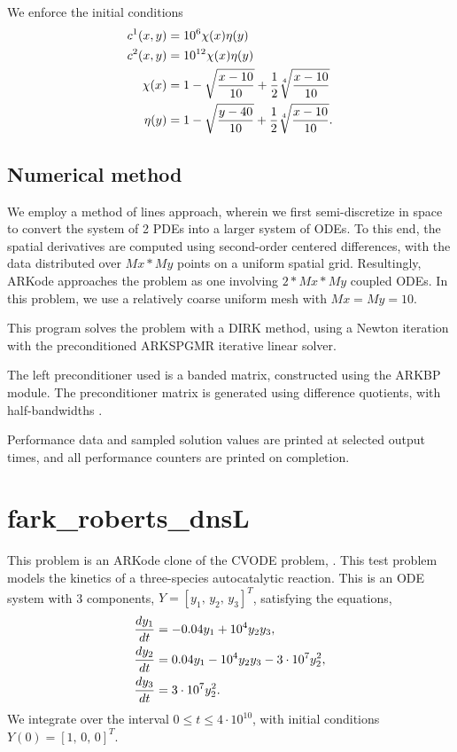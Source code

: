 \documentclass[letterpaper,10pt,english]{sphinxmanual}
\begin{document}
We enforce the initial conditions
\begin{gather}
\begin{split}c^1(x,y) &=  10^6 \chi(x)\eta(y) \\
c^2(x,y) &=  10^{12} \chi(x)\eta(y) \\
\chi(x) &= 1 - \sqrt{\frac{x - 10}{10}} + \frac12 \sqrt[4]{\frac{x - 10}{10}} \\
\eta(y) &= 1 - \sqrt{\frac{y - 40}{10}} + \frac12 \sqrt[4]{\frac{x - 10}{10}}.\end{split}\notag
\end{gather}

\subsection{Numerical method}
\label{f77_serial:numerical-method}
We employ a method of lines approach, wherein we first
semi-discretize in space to convert the system of 2 PDEs into a larger
system of ODEs.  To this end, the spatial derivatives are computed
using second-order centered differences, with the data distributed
over $Mx*My$ points on a uniform spatial grid.  Resultingly, ARKode
approaches the problem as one involving $2*Mx*My$ coupled ODEs.
In this problem, we use a relatively coarse uniform mesh with
$Mx=My=10$.

This program solves the problem with a DIRK method, using a Newton
iteration with the preconditioned ARKSPGMR iterative linear solver.

The left preconditioner used is a banded matrix, constructed using
the ARKBP module.  The preconditioner matrix is generated using
difference quotients, with half-bandwidths .

Performance data and sampled solution values are printed at
selected output times, and all performance counters are printed
on completion.


\section{fark\_roberts\_dnsL}
\label{f77_serial:id2}\label{f77_serial:fark-roberts-dnsl}
This problem is an ARKode clone of the CVODE problem,
.  This test problem models the kinetics of a
three-species autocatalytic reaction.  This is an ODE system with 3
components, $Y = [y_1,\, y_2,\, y_3]^T$, satisfying the equations,
\begin{gather}
\begin{split}\frac{d y_1}{dt} &= -0.04 y_1 + 10^4 y_2 y_3, \\
\frac{d y_2}{dt} &= 0.04 y_1 - 10^4 y_2 y_3 - 3\cdot10^7 y_2^2, \\
\frac{d y_3}{dt} &= 3\cdot10^7 y_2^2.\end{split}\notag
\end{gather}
We integrate over the interval $0\le t\le 4\cdot10^{10}$, with initial
conditions  $Y(0) = [1,\, 0,\, 0]^T$.
\end{document}
